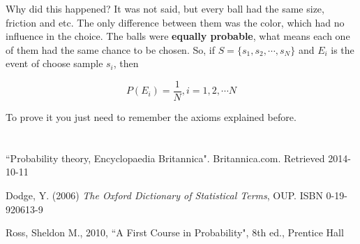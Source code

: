 \documentclass[a4paper,twocolumn]{article}
\begin{document}
Why did this happened? It was not said, but every ball had the same size, friction and etc. The only difference between them was the color, which had no influence in the choice. The balls were \textbf{equally probable}, what means each one of them had the same chance to be chosen. So, if $S = \{s_1, s_2,\dotsm,s_N\}$ and $E_i$ is the event of choose sample $s_i$, then

\begin{equation}
\label{eq:equally_prob}
P(E_i) = \frac{1}{N}, i = 1, 2, \dotsm N
\end{equation}

\noindent To prove it you just need to remember the axioms explained before.


\section{}


\begin{thebibliography}{9}
         ``Probability theory, Encyclopaedia Britannica".
         Britannica.com.
         Retrieved 2014-10-11

        Dodge, Y. (2006)
        \textit{The Oxford Dictionary of Statistical Terms}, OUP.
        ISBN 0-19-920613-9

        Ross, Sheldon M.,
        2010,
        ``A First Course in Probability", 8th ed.,
        Prentice Hall
\end{thebibliography}
\end{document}
